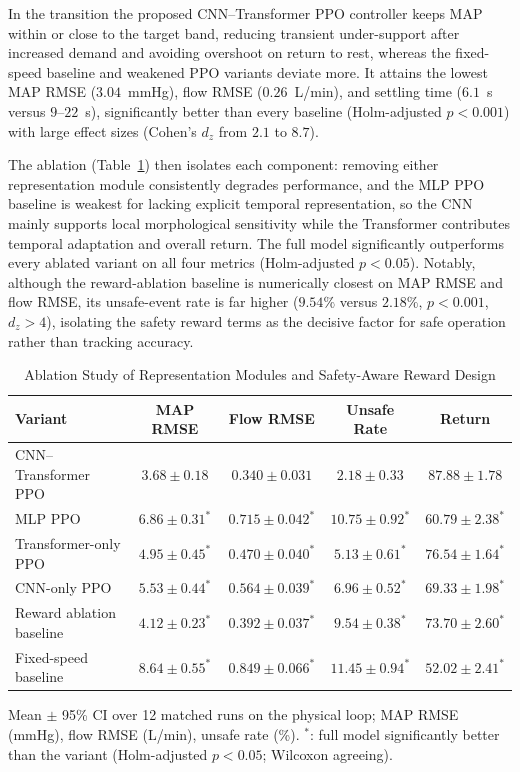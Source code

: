 \documentclass[sigconf]{acmart}
\begin{document}
In the transition the proposed CNN--Transformer PPO controller keeps MAP within or close to the target band, reducing transient under-support after increased demand and avoiding overshoot on return to rest, whereas the fixed-speed baseline and weakened PPO variants deviate more. It attains the lowest MAP RMSE ($3.04$~mmHg), flow RMSE ($0.26$~L/min), and settling time ($6.1$~s versus $9$--$22$~s), significantly better than every baseline (Holm-adjusted $p<0.001$) with large effect sizes (Cohen's $d_z$ from $2.1$ to $8.7$).

The ablation (Table~\ref{tab:ablation_results}) then isolates each component: removing either representation module consistently degrades performance, and the MLP PPO baseline is weakest for lacking explicit temporal representation, so the CNN mainly supports local morphological sensitivity while the Transformer contributes temporal adaptation and overall return. The full model significantly outperforms every ablated variant on all four metrics (Holm-adjusted $p<0.05$). Notably, although the reward-ablation baseline is numerically closest on MAP RMSE and flow RMSE, its unsafe-event rate is far higher ($9.54\%$ versus $2.18\%$, $p<0.001$, $d_z>4$), isolating the safety reward terms as the decisive factor for safe operation rather than tracking accuracy.

\begin{table}[!t]
\caption{Ablation Study of Representation Modules and Safety-Aware Reward Design}
\label{tab:ablation_results}
\centering
\footnotesize
\setlength{\tabcolsep}{3pt}
\begin{tabular}{lcccc}
\toprule
\textbf{Variant} & \textbf{MAP RMSE} & \textbf{Flow RMSE} & \textbf{Unsafe Rate} & \textbf{Return} \\
\midrule
CNN--Transformer PPO & $3.68 \pm 0.18$ & $0.340 \pm 0.031$ & $2.18 \pm 0.33$ & $87.88 \pm 1.78$ \\
MLP PPO & $6.86 \pm 0.31^{*}$ & $0.715 \pm 0.042^{*}$ & $10.75 \pm 0.92^{*}$ & $60.79 \pm 2.38^{*}$ \\
Transformer-only PPO & $4.95 \pm 0.45^{*}$ & $0.470 \pm 0.040^{*}$ & $5.13 \pm 0.61^{*}$ & $76.54 \pm 1.64^{*}$ \\
CNN-only PPO & $5.53 \pm 0.44^{*}$ & $0.564 \pm 0.039^{*}$ & $6.96 \pm 0.52^{*}$ & $69.33 \pm 1.98^{*}$ \\
Reward ablation baseline & $4.12 \pm 0.23^{*}$ & $0.392 \pm 0.037^{*}$ & $9.54 \pm 0.38^{*}$ & $73.70 \pm 2.60^{*}$ \\
Fixed-speed baseline & $8.64 \pm 0.55^{*}$ & $0.849 \pm 0.066^{*}$ & $11.45 \pm 0.94^{*}$ & $52.02 \pm 2.41^{*}$ \\
\bottomrule
\end{tabular}
\par\smallskip
{\scriptsize Mean $\pm$ 95\% CI over 12 matched runs on the physical loop; MAP RMSE (mmHg), flow RMSE (L/min), unsafe rate (\%). $^{*}$: full model significantly better than the variant (Holm-adjusted $p<0.05$; Wilcoxon agreeing).\par}
\end{table}
\end{document}
